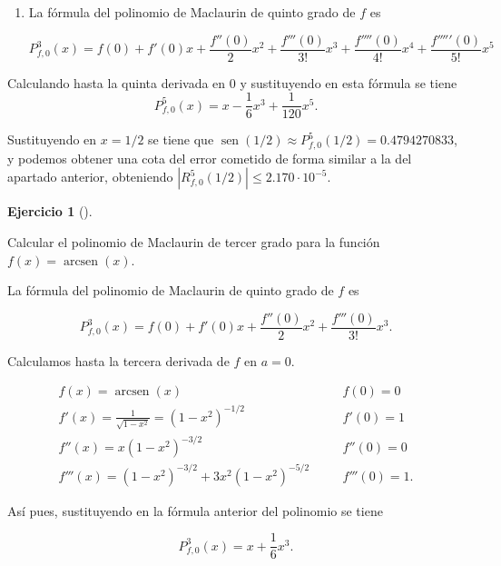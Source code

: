 \documentclass[
  spanish,
  a4paper,
]{scrreport}
\theoremstyle{definition}
\newtheorem{exercise}{Ejercicio}[chapter]
\theoremstyle{remark}
\begin{document}
\begin{tcolorbox}
\begin{enumerate}
  \[
   |R^3_{f,\pi/6}(1/2)|\leq \frac{1}{24}\left(\frac{1}{2}-\frac{\pi}{6}\right)^4 = 6.46\cdot 10^{-9}.
   \]
\item
  La fórmula del polinomio de Maclaurin de quinto grado de \(f\) es

  \[
   P^3_{f,0}(x) = f(0)+f'(0)x+ \frac{f''(0)}{2}x^2+\frac{f'''(0)}{3!}x^3+ \frac{f''''(0)}{4!}x^4+\frac{f'''''(0)}{5!}x^5
   \]
\end{enumerate}

Calculando hasta la quinta derivada en \(0\) y sustituyendo en esta
fórmula se tiene \[
P^5_{f,0}(x) = x -\frac{1}{6} x^3 + \frac{1}{120}x^5.
\]

Sustituyendo en \(x=1/2\) se tiene que
\(\operatorname{sen}(1/2) \approx P^5_{f,0}(1/2) = 0.4794270833\), y
podemos obtener una cota del error cometido de forma similar a la del
apartado anterior, obteniendo
\(|R^5_{f,0}(1/2)|\leq 2.170\cdot 10^{-5}\).

\end{tcolorbox}

\begin{exercise}[]\protect\hypertarget{exr-taylor-2}{}\label{exr-taylor-2}

Calcular el polinomio de Maclaurin de tercer grado para la función
\(f(x)=\operatorname{arcsen}(x)\).

\end{exercise}

\begin{tcolorbox}[enhanced jigsaw, arc=.35mm, bottomrule=.15mm, bottomtitle=1mm, breakable, colback=white, colbacktitle=quarto-callout-tip-color!10!white, colframe=quarto-callout-tip-color-frame, coltitle=black, left=2mm, leftrule=.75mm, opacityback=0, opacitybacktitle=0.6, rightrule=.15mm, title=\textcolor{quarto-callout-tip-color}{\faLightbulb}\hspace{0.5em}{Solución}, titlerule=0mm, toprule=.15mm, toptitle=1mm]

La fórmula del polinomio de Maclaurin de quinto grado de \(f\) es

\[
P^3_{f,0}(x) = f(0)+f'(0)x+ \frac{f''(0)}{2}x^2+\frac{f'''(0)}{3!}x^3.
\]

Calculamos hasta la tercera derivada de \(f\) en \(a=0\).

\[
\begin{array}{lll}
f(x) = \operatorname{arcsen}(x) & \quad &  f(0) = 0\\ 
f'(x) =\frac{1}{\sqrt{1-x^2}}=(1-x^2)^{-1/2} & \quad & f'(0) = 1\\ 
f''(x) = x(1-x^2)^{-3/2} & \quad & f''(0) = 0\\ 
f'''(x) = (1-x^2)^{-3/2}+3x^2(1-x^2)^{-5/2} & \quad & f'''(0) = 1.
\end{array}
\]

Así pues, sustituyendo en la fórmula anterior del polinomio se tiene

\[
P^3_{f,0}(x) = x+\frac{1}{6}x^3.
\]

\end{tcolorbox}
\end{document}
